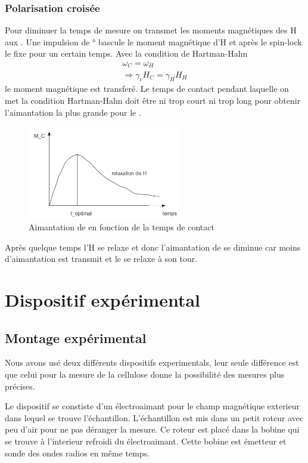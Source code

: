 \documentclass[a4paper,12pt]{scrartcl}
\begin{document}
   \subsubsection{Polarisation croisée}
    Pour diminuer la temps de mesure on transmet les moments magnétiques des H aux . Une impulsion de \unit[90]{\degree} bascule le moment magnétique d'H et après le spin-lock le fixe pour un certain temps. Avec la condition de Hartman-Hahn
    \begin{eqnarray*}
     \omega_C=\omega_H\\
     \Rightarrow \gamma_c H_C=\gamma_H H_H
    \end{eqnarray*}
    le moment magnétique est transferé. Le temps de contact pendant laquelle on met la condition Hartman-Hahn doit être ni trop court ni trop long pour obtenir l'aimantation la plus grande pour le . 
    \begin{figure}[H]
     \includegraphics[width=0.6\textwidth]{bilder/schema_pol.png}
     \caption{Aimantation de  en fonction de la temps de contact}
    \end{figure}
    Après quelque temps l'H se relaxe et donc l'aimantation de  se diminue car moins d'aimantation est transmit et le  se relaxe à son tour.
     

 \section{Dispositif expérimental}
  \subsection{Montage expérimental}
   Nous avons usé deux différents dispositifs experimentals, leur seule différence est que celui pour la mesure de la cellulose donne la possibilité des mesures plus précises.

   Le dispositif se constiste d'un électroaimant pour le champ magnétique exterieur dans lequel se trouve l'échantillon. L'échantillon est mis dans un petit roteur avec peu d'air pour ne pas déranger la mesure. Ce roteur est placé dans la bobine qui se trouve à l'interieur refroidi du électroaimant. Cette bobine est émetteur et sonde des ondes radios en même temps. 
\end{document}
